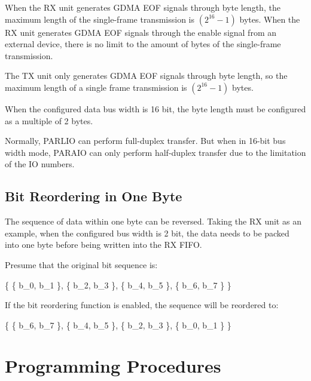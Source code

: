 \documentclass[main\_\_EN.tex]{subfiles}
\begin{document}
When the RX unit generates GDMA EOF signals through byte length, the maximum length of the single-frame transmission is \begin{math} (2^{16}-1) \end{math} bytes. When the RX unit generates GDMA EOF signals through the enable signal from an external device, there is no limit to the amount of bytes of the single-frame transmission.

The TX unit only generates GDMA EOF signals through byte length, so the maximum length of a single frame transmission is \begin{math} (2^{16}-1) \end{math} bytes.

When the configured data bus width is 16 bit, the byte length must be configured as a multiple of 2 bytes.

Normally, PARLIO can perform full-duplex transfer. But when in 16-bit bus width mode, PARAIO can only perform half-duplex transfer due to the limitation of the IO numbers.

\subsection{Bit Reordering in One Byte}
The sequence of data within one byte can be reversed. Taking the RX unit as an example, when the configured bus width is 2 bit, the data needs to be packed into one byte before being written into the RX FIFO.

Presume that the original bit sequence is:

\begin{center}
\{ \{ b\_{0}, b\_{1} \}, \{ b\_{2}, b\_{3} \}, \{ b\_{4}, b\_{5} \}, \{ b\_{6}, b\_{7} \} \}
\end{center}

If the bit reordering function is enabled, the sequence will be reordered to:

\begin{center}
\{ \{ b\_{6}, b\_{7} \}, \{ b\_{4}, b\_{5} \}, \{ b\_{2}, b\_{3} \}, \{ b\_{0}, b\_{1} \} \}
\end{center}





\section{Programming Procedures}
\label{sec:parlio-prog-procedures}
\end{document}
